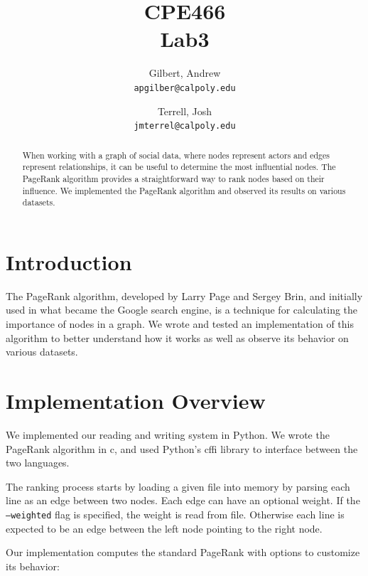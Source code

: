\documentclass[draft]{report}
\title{CPE466\\Lab3}
\author{
  Gilbert, Andrew\\
  \texttt{apgilber@calpoly.edu}
  \and
  Terrell, Josh\\
  \texttt{jmterrel@calpoly.edu}
}
\date{}
\newcommand{\pagerank}{PageRank }
\begin{document}
\maketitle

\begin{abstract}
When working with a graph of social data, where nodes represent actors and edges
represent relationships, it can be useful to determine the most influential
nodes. The \pagerank algorithm provides a straightforward way to rank nodes based
on their influence. We implemented the \pagerank algorithm and observed its
results on various datasets.
\end{abstract}

\section{Introduction}
The \pagerank algorithm, developed by Larry Page and Sergey Brin, and initially
used in what became the Google search engine, is a technique for calculating the
importance of nodes in a graph. We wrote and tested an implementation of this
algorithm to better understand how it works as well as observe its behavior on
various datasets.

\section{Implementation Overview}
We implemented our reading and writing system in Python. We wrote the
\pagerank algorithm in c, and used Python's cffi library to interface between
the two languages.

The ranking process starts by loading a given file into memory by parsing each
line as an edge between two nodes. Each edge can have an optional weight. If the
\texttt{--weighted} flag is specified, the weight is read from file. Otherwise
each line is expected to be an edge between the left node pointing to the right
node.

Our implementation computes the standard \pagerank with options to customize its
behavior: 
\end{document}
